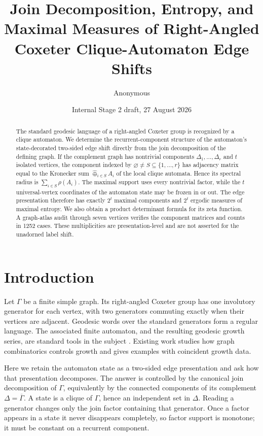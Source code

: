 \documentclass[11pt,a4paper]{amsart}
\title[Join components of RACG clique-automaton shifts]{Join Decomposition, Entropy, and Maximal Measures of Right-Angled Coxeter Clique-Automaton Edge Shifts}
\author{Anonymous}
\date{Internal Stage 2 draft, 27 August 2026}
\theoremstyle{definition}
\theoremstyle{remark}
\newcommand{\bigoplusK}{\mathbin{\widehat\oplus}}
\begin{document}
\begin{abstract}
The standard geodesic language of a right-angled Coxeter group is recognized
by a clique automaton.  We determine the recurrent-component structure of
the automaton's state-decorated two-sided edge shift directly from the join
decomposition of the defining graph.  If the complement graph has nontrivial components
$\Delta_1,\ldots,\Delta_r$ and $t$ isolated vertices, the component indexed by
$\varnothing\neq S\subseteq\{1,\ldots,r\}$ has adjacency matrix equal to the
Kronecker sum $\bigoplusK_{i\in S}A_i$ of the local clique automata.  Hence its
spectral radius is $\sum_{i\in S}\rho(A_i)$.  The maximal support uses every
nontrivial factor, while the $t$ universal-vertex coordinates of the
automaton state may be frozen in or out.  The edge presentation therefore has
exactly $2^t$ maximal components and $2^t$ ergodic measures of maximal
entropy.  We also obtain a product determinant formula for its zeta function.
A graph-atlas audit through seven vertices verifies the component matrices
and counts in 1252 cases.  These multiplicities are presentation-level and
are not asserted for the unadorned label shift.
\end{abstract}

\maketitle

\section{Introduction}

Let $\Gamma$ be a finite simple graph.  Its right-angled Coxeter group has one
involutory generator for each vertex, with two generators commuting exactly
when their vertices are adjacent.  Geodesic words over the standard
generators form a regular language.  The associated finite automaton, and the
resulting geodesic growth series, are standard tools in the subject
\cite{BrinkHowlett1993,AntolinCiobanu2013}.  Existing work studies how graph
combinatorics controls growth and gives examples with coincident growth data.

Here we retain the automaton state as a two-sided edge presentation and ask
how that presentation decomposes.  The answer is controlled by the canonical join
decomposition of $\Gamma$, equivalently by the connected components of its
complement $\Delta=\overline\Gamma$.  A state is a clique of $\Gamma$, hence
an independent set in $\Delta$.  Reading a generator changes only the join
factor containing that generator.  Once a factor appears in a state it never
disappears completely, so factor support is monotone; it must be constant on
a recurrent component.
\end{document}
